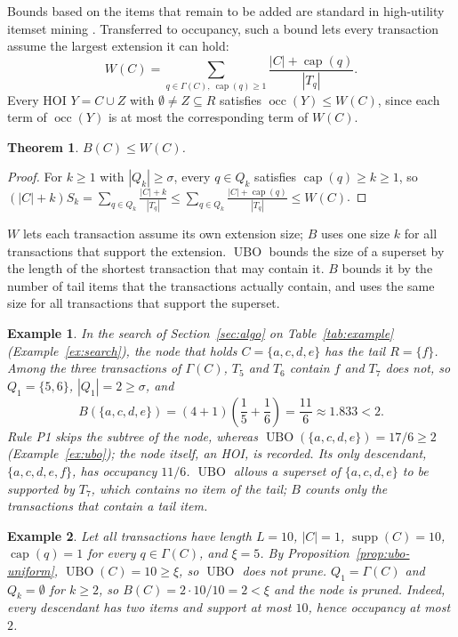 \documentclass[pdflatex,sn-mathphys,Numbered]{sn-jnl}
\theoremstyle{thmstyleone}
\newtheorem{theorem}{Theorem}
\theoremstyle{thmstyletwo}
\newtheorem{example}{Example}
\theoremstyle{thmstylethree}
\newcommand{\supp}{\operatorname{supp}}
\newcommand{\occ}{\operatorname{occ}}
\newcommand{\ubo}{\operatorname{UBO}}
\newcommand{\capa}{\operatorname{cap}}
\begin{document}
Bounds based on the items that remain to be added are standard in high-utility itemset mining \cite{liu2012huiminer,zida2017efim,gan2020huopm}. Transferred to occupancy, such a bound lets every transaction assume the largest extension it can hold:
\[
W(C) = \sum_{q \in \Gamma(C),\ \capa(q) \ge 1} \frac{|C| + \capa(q)}{|T_q|}.
\]
Every HOI $Y = C \cup Z$ with $\emptyset \ne Z \subseteq R$ satisfies $\occ(Y) \le W(C)$, since each term of $\occ(Y)$ is at most the corresponding term of $W(C)$.

\begin{theorem}\label{thm:pertrans}
$B(C) \le W(C)$.
\end{theorem}
\begin{proof}
For $k \ge 1$ with $|Q_k| \ge \sigma$, every $q \in Q_k$ satisfies $\capa(q) \ge k \ge 1$, so
$(|C| + k) S_k = \sum_{q \in Q_k} \frac{|C| + k}{|T_q|} \le \sum_{q \in Q_k} \frac{|C| + \capa(q)}{|T_q|} \le W(C)$.
\end{proof}

$W$ lets each transaction assume its own extension size; $B$ uses one size $k$ for all transactions that support the extension. $\ubo$ bounds the size of a superset by the length of the shortest transaction that may contain it. $B$ bounds it by the number of tail items that the transactions actually contain, and uses the same size for all transactions that support the superset.

\begin{example}\label{ex:coupled-running}
In the search of Section~\ref{sec:algo} on Table~\ref{tab:example} (Example~\ref{ex:search}), the node that holds $C = \{a,c,d,e\}$ has the tail $R = \{f\}$. Among the three transactions of $\Gamma(C)$, $T_5$ and $T_6$ contain $f$ and $T_7$ does not, so $Q_1 = \{5, 6\}$, $|Q_1| = 2 \ge \sigma$, and
\[
B(\{a,c,d,e\}) = (4 + 1)\left( \frac15 + \frac16 \right) = \frac{11}{6} \approx 1.833 < 2.
\]
Rule P1 skips the subtree of the node, whereas $\ubo(\{a,c,d,e\}) = 17/6 \ge 2$ (Example~\ref{ex:ubo}); the node itself, an HOI, is recorded. Its only descendant, $\{a,c,d,e,f\}$, has occupancy $11/6$. $\ubo$ allows a superset of $\{a,c,d,e\}$ to be supported by $T_7$, which contains no item of the tail; $B$ counts only the transactions that contain a tail item.
\end{example}

\begin{example}\label{ex:coupled}
Let all transactions have length $L = 10$, $|C| = 1$, $\supp(C) = 10$, $\capa(q) = 1$ for every $q \in \Gamma(C)$, and $\xi = 5$. By Proposition~\ref{prop:ubo-uniform}, $\ubo(C) = 10 \ge \xi$, so $\ubo$ does not prune. $Q_1 = \Gamma(C)$ and $Q_k = \emptyset$ for $k \ge 2$, so $B(C) = 2 \cdot 10/10 = 2 < \xi$ and the node is pruned. Indeed, every descendant has two items and support at most $10$, hence occupancy at most $2$.
\end{example}
\end{document}
